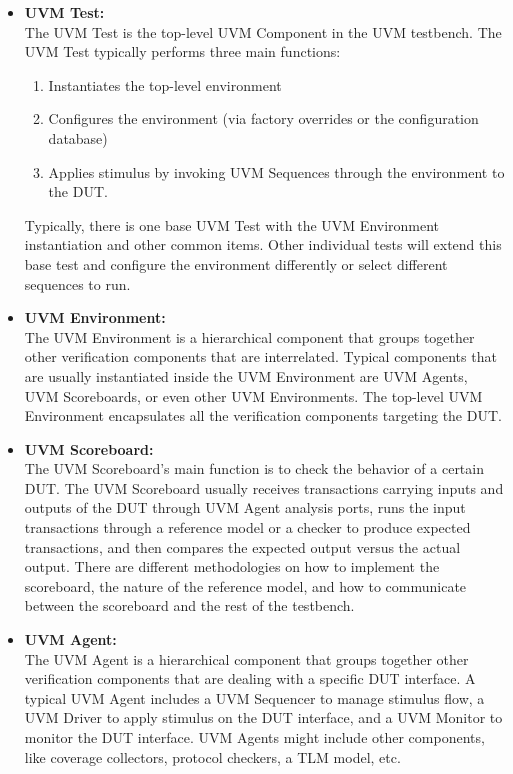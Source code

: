 \documentclass[../main.tex]{subfiles}
\begin{document}
\begin{itemize}
  
\item \textbf{UVM Test:}\\
The UVM Test is the top-level UVM Component in the UVM testbench. The UVM Test typically performs
three main functions:

\begin{enumerate}
    \item Instantiates the top-level environment
    \item Configures the environment (via factory overrides or the configuration database)
    \item Applies stimulus by invoking UVM Sequences through the environment to the DUT.
\end{enumerate}

Typically, there is one base UVM Test with the UVM Environment instantiation and other common items. Other individual tests will extend this base test and configure the environment differently or select different sequences to run.

\item \textbf{UVM Environment:}\\
The UVM Environment is a hierarchical component that groups together other verification components that
are interrelated. Typical components that are usually instantiated inside the UVM Environment are UVM
Agents, UVM Scoreboards, or even other UVM Environments. 
The top-level UVM Environment encapsulates all the verification components targeting the DUT.

\item \textbf{UVM Scoreboard:}\\
The UVM Scoreboard’s main function is to check the behavior of a certain DUT. The UVM Scoreboard
usually receives transactions carrying inputs and outputs of the DUT through UVM Agent analysis ports, runs the input transactions through a reference model or a checker to produce expected transactions, and then compares the expected
output versus the actual output.
There are different methodologies on how to implement the scoreboard, the nature of the reference model,
and how to communicate between the scoreboard and the rest of the testbench.

\item \textbf{UVM Agent:}\\
The UVM Agent is a hierarchical component that groups together other verification components that are
dealing with a specific DUT interface. A typical UVM Agent includes a UVM Sequencer to
manage stimulus flow, a UVM Driver to apply stimulus on the DUT interface, and a UVM Monitor to monitor the DUT interface. UVM Agents might include other components, like coverage collectors, protocol checkers, a TLM model, etc.


\end{itemize}
\end{document}
